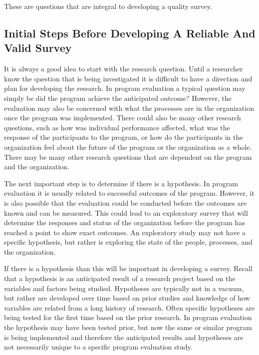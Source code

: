 \documentclass[]{book}
\theoremstyle{definition}
\theoremstyle{definition}
\theoremstyle{definition}
\theoremstyle{remark}
\begin{document}
These are questions that are integral to developing a quality survey.

\hypertarget{initial-steps-before-developing-a-reliable-and-valid-survey}{%
\subsection{Initial Steps Before Developing A Reliable And Valid
Survey}\label{initial-steps-before-developing-a-reliable-and-valid-survey}}

It is always a good idea to start with the research question. Until a
researcher know the question that is being investigated it is difficult
to have a direction and plan for developing the research. In program
evaluation a typical question may simply be did the program achieve the
anticipated outcome? However, the evaluation may also be concerned with
what the processes are in the organization once the program was
implemented. There could also be many other research questions, such as
how was individual performance affected, what was the response of the
participants to the program, or how do the participants in the
organization feel about the future of the program or the organization as
a whole. There may be many other research questions that are dependent
on the program and the organization.

The next important step is to determine if there is a hypothesis. In
program evaluation it is usually related to successful outcomes of the
program. However, it is also possible that the evaluation could be
conducted before the outcomes are known and can be measured. This could
lead to an exploratory survey that will determine the responses and
status of the organization before the program has reached a point to
show exact outcomes. An exploratory study may not have a specific
hypothesis, but rather is exploring the state of the people, processes,
and the organization.

If there is a hypothesis than this will be important in developing a
survey. Recall that a hypothesis is an anticipated result of a research
project based on the variables and factors being studied. Hypotheses are
typically not in a vacuum, but rather are developed over time based on
prior studies and knowledge of how variables are related from a long
history of research. Often specific hypotheses are being tested for the
first time based on the prior research. In program evaluation the
hypothesis may have been tested prior, but now the same or similar
program is being implemented and therefore the anticipated results and
hypotheses are not necessarily unique to a specific program evaluation
study.
\end{document}
